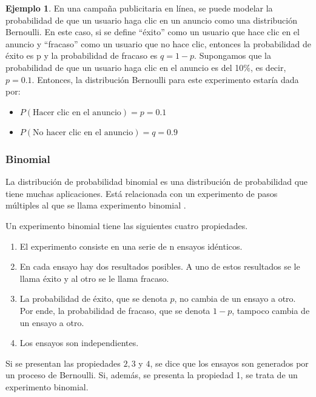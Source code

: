 \documentclass[
  11pt,
]{book}
\providecommand{\tightlist}{%
  \setlength{\itemsep}{0pt}\setlength{\parskip}{0pt}}
\theoremstyle{definition}
\theoremstyle{definition}
\newtheorem{example}{Ejemplo}[chapter]
\theoremstyle{definition}
\theoremstyle{definition}
\theoremstyle{remark}
\begin{document}
\begin{example}

En una campaña publicitaria en línea, se puede modelar la probabilidad de que un usuario haga clic en un anuncio como una distribución Bernoulli. En este caso, si se define ``éxito'' como un usuario que hace clic en el anuncio y ``fracaso'' como un usuario que no hace clic, entonces la probabilidad de éxito es p y la probabilidad de fracaso es \(q = 1 - p\). Supongamos que la probabilidad de que un usuario haga clic en el anuncio es del 10\%, es decir, \(p = 0.1\). Entonces, la distribución Bernoulli para este experimento estaría dada por:

\begin{itemize}
\tightlist
\item
  \(P(\text{Hacer clic en el anuncio}) = p = 0.1\)
\item
  \(P(\text{No hacer clic en el anuncio}) = q = 0.9\)
\end{itemize}

\end{example}

\subsubsection{Binomial}\label{probabilidad-variable-aleatoria-discreta-distribucion-binomial}

La distribución de probabilidad binomial es una distribución de probabilidad que tiene muchas aplicaciones. Está relacionada con un experimento de pasos múltiples al que se llama experimento binomial \citep[paǵina 200]{anderson}.

Un experimento binomial tiene las siguientes cuatro propiedades.

\begin{enumerate}
\def\labelenumi{\arabic{enumi}.}
\tightlist
\item
  El experimento consiste en una serie de n ensayos idénticos.
\item
  En cada ensayo hay dos resultados posibles. A uno de estos resultados se le llama éxito y al otro se le llama fracaso.
\item
  La probabilidad de éxito, que se denota \(p\), no cambia de un ensayo a otro. Por ende, la probabilidad de fracaso, que se denota \(1 - p\), tampoco cambia de un ensayo a otro.
\item
  Los ensayos son independientes.
\end{enumerate}

Si se presentan las propiedades \(2, 3\) y \(4\), se dice que los ensayos son generados por un proceso de Bernoulli. Si, además, se presenta la propiedad 1, se trata de un experimento binomial.
\end{document}
